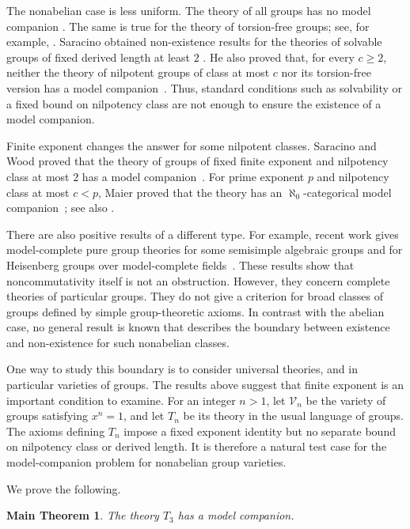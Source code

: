 \documentclass[11pt,reqno]{article}
\newtheorem*{maintheorem*}{Main Theorem}
\theoremstyle{definition}
\theoremstyle{remark}
\begin{document}
The nonabelian case is less uniform. 
The theory of all groups has no model companion \cite[Example~3.5.16]{ChangKeisler1990}.
The same is true for the theory of torsion-free groups; see, for example, \cite{Takeuchi2022}.
Saracino obtained non-existence results for the theories of solvable groups of fixed derived length at least $2$ \cite{Saracino1974}. 
He also proved that, for every $c\geq2$, neither the theory of nilpotent groups of class at most $c$ nor its torsion-free version has a model companion~\cite{Saracino1976}. 
Thus, standard conditions such as solvability or a fixed bound on nilpotency class are not enough to ensure the existence of a model companion.

Finite exponent changes the answer for some nilpotent classes.
Saracino and Wood proved that the theory of groups of fixed finite exponent and nilpotency class at most $2$ has a model companion~\cite{SaracinoWood1979}.
For prime exponent $p$ and nilpotency class at most $c<p$, Maier proved that the theory has an
$\aleph_0$-categorical model companion~\cite{Maier1989}; see also
\cite[Corollary~4.42]{dElbeeMuellerRamseySiniora2025}.

There are also positive results of a different type.
For example, recent work gives model-complete pure group theories for some semisimple algebraic groups and for Heisenberg groups over model-complete fields~\cite{HoffmannKowalskiTranYe2023,FracekKowalski2025}.
These results show that noncommutativity itself is not an obstruction.
However, they concern complete theories of particular groups.
They do not give a criterion for broad classes of groups defined by simple group-theoretic axioms.
In contrast with the abelian case, no general result is known that describes the boundary between existence and non-existence for such nonabelian classes.

One way to study this boundary is to consider universal theories, and in particular varieties of groups.
The results above suggest that finite exponent is an important condition to examine.
For an integer $n>1$, let $\mathcal V_n$ be the variety of groups satisfying $x^n=1$, and let $T_n$ be its theory in the usual language of groups.
The axioms defining $T_n$ impose a fixed exponent identity but no separate bound on nilpotency class or derived length.
It is therefore a natural test case for the model-companion problem for nonabelian group varieties.

We prove the following.

\begin{maintheorem*}
The theory $T_3$ has a model companion.
\end{maintheorem*}
\end{document}
